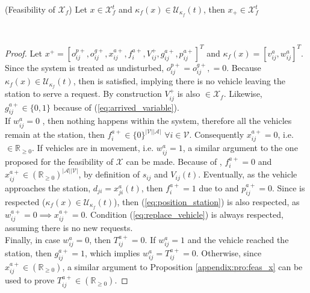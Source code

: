 \begin{proposition}{(Feasibility of $\mathcal{X}_f$)}\label{appendix:pro:feas_xf}
	Let $x \in \mathcal{X}^t_f$ and $\kappa_f(x) \in \mathcal{U}_{\kappa_f}(t)$, then $x_+\in \mathcal{X}^t_f$
\end{proposition}\\

\begin{proof}
	 Let $x^+ = [o_{ij}^{p+}, o_{ij}^{g+}, x_{ij}^{a+}, f^{a+}_{i}, V_{ij}^{+}, g^{a+}_{ij}, p^{a+}_{ij}]^T$ and $\kappa_f(x) = [v^{a}_{ij}, w^{a}_{ij}]^T$. Since the system is treated as undisturbed, $o_{ij}^{p+}= o_{ij}^{g+},=0$. Because $\kappa_f(x) \in \mathcal{U}_{\kappa_f}(t)$, then  is satisfied, implying there is no vehicle leaving the station to serve a request. By construction $V_{ij}^{+}$ is also $\in \mathcal{X}_f$. Likewise, $g^{a+}_{ij}\in \{0,1\}$ because of (\ref{eq:arrived_variable}). \\
If $w^a_{ij} = 0$ , then nothing happens within the system, therefore all the vehicles remain at the station, then $ f^{a+}_{i} \in \{0\}^{|\mathcal{V}||\mathcal{A}|}$ $\forall i \in \mathcal{V}$. Consequently   $x_{ij}^{a+} = 0$, i.e.  $\in \mathbb{R}_{\ge 0}$. If vehicles are in movement, i.e. $w^a_{ij} = 1$, a similar argument to the one proposed for the feasibility of $\mathcal{X}$ can be made. Because of , $f^{a+}_{i}=0$ and $x_{ij}^{a+}\in (\mathbb{R}_{\ge 0})^{|\mathcal{A}||\mathcal{V}|}$, by definition of $s_{ij}$ and $V_{ij}(t)$. Eventually, as the vehicle approaches the station, $d_{ji} = x^a_{ji}(t)$, then $f^{a+}_{i}=1$ due to  and $p^{a+}_{ij}=0$. Since 
 is respected ($\kappa_f(x) \in \mathcal{U}_{\kappa_f}(t)$), then  (\ref{eq:position_station}) is also respected, as $ w^{a+}_{ij}=0 \implies x_{ij}^{a+}=0$. Condition (\ref{eq:replace_vehicle}) is always respected, assuming there is no new requests. \\
Finally, in case $w^a_{ij} = 0$, then $T_{ij}^{a+}  = 0$. If $w^a_{ij} = 1$ and the vehicle reached the station, then $g^{a+}_{ij} =1$, which implies $w^a_{ij} = T_{ij}^{a+}  =0$. Otherwise, since $x_{ij}^{a+}\in (\mathbb{R}_{\ge 0})$, a similar argument to Proposition \ref{appendix:pro:feas_x} can be used to prove $T_{ij}^{a+}\in (\mathbb{R}_{\ge 0})$.
\end{proof}